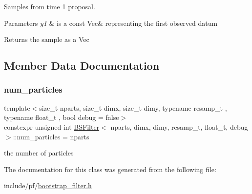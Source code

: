 Samples from time 1 proposal. 


\begin{DoxyParams}{Parameters}
{\em y1} & is a const Vec\& representing the first observed datum \\
\hline
\end{DoxyParams}
\begin{DoxyReturn}{Returns}
the sample as a Vec 
\end{DoxyReturn}


\subsection{Member Data Documentation}
\mbox{\label{classBSFilter_a2a6b1e1870c1a4f3e7ca0b721b697ce2}} 
\subsubsection{\texorpdfstring{num\+\_\+particles}{num\_particles}}
{\footnotesize\ttfamily template$<$size\+\_\+t nparts, size\+\_\+t dimx, size\+\_\+t dimy, typename resamp\+\_\+t , typename float\+\_\+t , bool debug = false$>$ \\
constexpr unsigned int \hyperlink{classBSFilter}{B\+S\+Filter}$<$ nparts, dimx, dimy, resamp\+\_\+t, float\+\_\+t, debug $>$\+::num\+\_\+particles = nparts\hspace{0.3cm}{\ttfamily [static]}}

the number of particles 

The documentation for this class was generated from the following file\+:\begin{DoxyCompactItemize}
\item 
include/pf/\hyperlink{bootstrap__filter_8h}{bootstrap\+\_\+filter.\+h}\end{DoxyCompactItemize}
